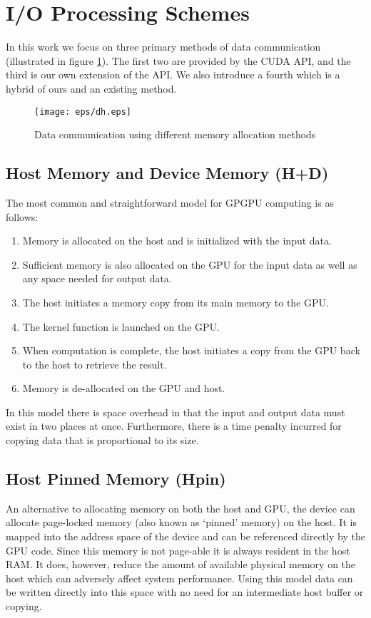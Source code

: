 \section{I/O Processing Schemes}
\label{sec:io_processing}

In this work we focus on three primary methods of data communication (illustrated in figure \ref{fig:comm_models}).
The first two are provided by the CUDA API, and the third is our own extension of the API. We also introduce a fourth which is a hybrid of ours and an existing method.
\begin{figure}[!t]
\centering
\texttt{[image: eps/dh.eps]}
\caption{Data communication using different memory allocation methods}
\label{fig:comm_models}
\end{figure}
\subsection{Host Memory and Device Memory (H+D)}
The most common and straightforward model for GPGPU computing is as follows: 
\begin{enumerate} \itemsep1pt
\item Memory is allocated on the host and is initialized with the input data.
\item Sufficient memory is also allocated on the GPU for the input data as well as any space needed for output data.
\item The host initiates a memory copy from its main memory to the GPU.
\item The kernel function is launched on the GPU.
\item When computation is complete, the host initiates a copy from the GPU back to the host to retrieve the result.
\item Memory is de-allocated on the GPU and host.
\end{enumerate}

In this model there is space overhead in that the input and output
data must exist in two places at once. Furthermore, there is a time
penalty incurred for copying data that is proportional to its size. 

\subsection{Host Pinned Memory (Hpin)}
An alternative to allocating memory on both the host and GPU, the device
can allocate page-locked memory (also known as `pinned' memory) on
the host. It is mapped into the address space of the device and can be 
referenced directly by the GPU code. Since this memory is not page-able it is always resident in
the host RAM. It does, however, reduce the amount of available physical memory on the host 
which can adversely affect system performance.
Using this model data can be written directly into this space with
no need for an intermediate host buffer or copying\cite{CUDA}.  

